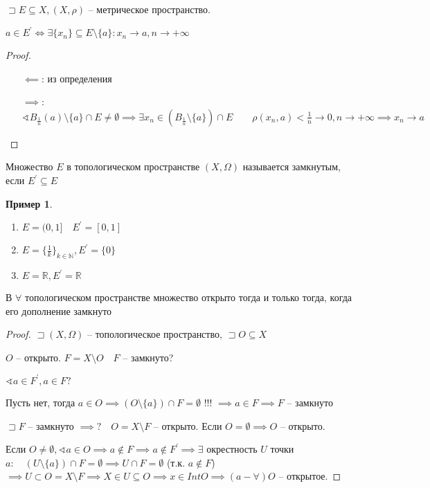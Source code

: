 \documentclass{book}
\newcommand\N{\ensuremath{\mathbb{N}}}
\newcommand\R{\ensuremath{\mathbb{R}}}
\renewcommand\O{\ensuremath{\emptyset}}
\newcommand{\p}[1]{#1^{\prime}}
\theoremstyle{definition}
\newtheorem*{example}{Пример}
\begin{document}
\begin{statement}
    $\sqsupset E\subseteq X, (X, \rho)$ -- метрическое пространство.

    $a\in \p E \iff  \exists \{x_{n} \} \subseteq E\setminus \{a\}: x_{n} \to a, n\to +\infty $
\end{statement}
\begin{proof}
    \begin{itemize}
        \item [$\impliedby$:] из определения
        \item [$\implies $:] $\sphericalangle B_{\frac{1}{n}}(a)\setminus \{a\} \cap E\neq \O  \implies  \exists x_n\in (B_{\frac{1}{n}}\setminus \{a\})\cap E\qquad \rho(x_{n} , a) <\frac{1}{n} \to 0, n\to +\infty  \implies  x_{n} \to a$
    \end{itemize}
\end{proof}
\begin{definition}
    Множество $E$  в топологическом пространстве  $(X, \Omega)$ называется замкнутым, если $\p E \subseteq E$
\end{definition}
\begin{example}
    \begin{enumerate}
        \item $E = (0,1]\quad \p E = [0,1]$
        \item  $E = \{\frac{1}{k}\}_{k\in \N }, \p E = \{0\}$ 
        \item $E = \R, \p E = \R$
    \end{enumerate}
\end{example}
\begin{theorem}
    В $\forall $ топологическом пространстве множество открыто тогда и только тогда, когда его дополнение замкнуто
\end{theorem}
\begin{proof}
    $\sqsupset (X, \Omega)$ -- топологическое пространство, $\sqsupset O\subseteq X$

    $O$ -- открыто. $F = X\setminus O\quad F$ -- замкнуто?

    $\sphericalangle a\in \p F, a\in F?$

    Пусть нет, тогда $a\in O \implies (O\setminus \{a\})\cap F = \O $ !!! $\implies  a\in F \implies F$ -- замкнуто 

    $\sqsupset F$ -- замкнуто $\implies ?\quad O = X\setminus F$ -- открыто. Если $O = \O  \implies  O$ -- открыто.

    Если $O\neq \O , \sphericalangle a\in O \implies a \not\in F \implies a\not\in \p F \implies \exists $ окрестность $U$ точки $a:\quad \left( U\setminus \{a\} \right) \cap F = \O \implies  U\cap F = \O $ (т.к. $a\not\in F$) $\implies  U\subset O = X\setminus F \implies  X\in U\subseteq O \implies x\in Int O \implies (a-\forall )O $ -- открытое.
\end{proof}
\end{document}
